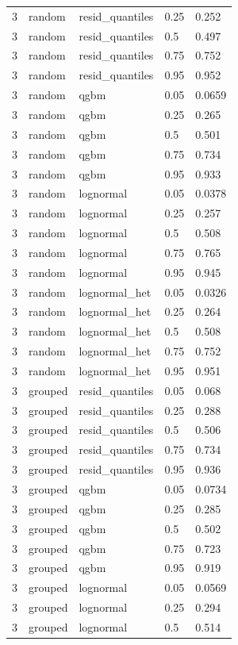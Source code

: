 \begin{tabular}{lllll}
3 & random & resid\_quantiles & 0.25 & 0.252 \\
3 & random & resid\_quantiles & 0.5 & 0.497 \\
3 & random & resid\_quantiles & 0.75 & 0.752 \\
3 & random & resid\_quantiles & 0.95 & 0.952 \\
3 & random & qgbm & 0.05 & 0.0659 \\
3 & random & qgbm & 0.25 & 0.265 \\
3 & random & qgbm & 0.5 & 0.501 \\
3 & random & qgbm & 0.75 & 0.734 \\
3 & random & qgbm & 0.95 & 0.933 \\
3 & random & lognormal & 0.05 & 0.0378 \\
3 & random & lognormal & 0.25 & 0.257 \\
3 & random & lognormal & 0.5 & 0.508 \\
3 & random & lognormal & 0.75 & 0.765 \\
3 & random & lognormal & 0.95 & 0.945 \\
3 & random & lognormal\_het & 0.05 & 0.0326 \\
3 & random & lognormal\_het & 0.25 & 0.264 \\
3 & random & lognormal\_het & 0.5 & 0.508 \\
3 & random & lognormal\_het & 0.75 & 0.752 \\
3 & random & lognormal\_het & 0.95 & 0.951 \\
3 & grouped & resid\_quantiles & 0.05 & 0.068 \\
3 & grouped & resid\_quantiles & 0.25 & 0.288 \\
3 & grouped & resid\_quantiles & 0.5 & 0.506 \\
3 & grouped & resid\_quantiles & 0.75 & 0.734 \\
3 & grouped & resid\_quantiles & 0.95 & 0.936 \\
3 & grouped & qgbm & 0.05 & 0.0734 \\
3 & grouped & qgbm & 0.25 & 0.285 \\
3 & grouped & qgbm & 0.5 & 0.502 \\
3 & grouped & qgbm & 0.75 & 0.723 \\
3 & grouped & qgbm & 0.95 & 0.919 \\
3 & grouped & lognormal & 0.05 & 0.0569 \\
3 & grouped & lognormal & 0.25 & 0.294 \\
3 & grouped & lognormal & 0.5 & 0.514 \\

\end{tabular}
